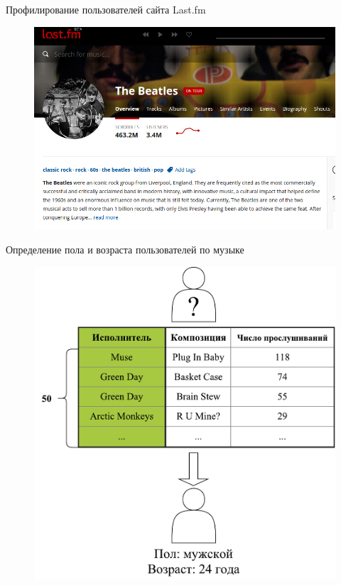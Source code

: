 \documentclass{beamer}
\begin{document}
\begin{frame}{Профилирование пользователей сайта Last.fm}
    \begin{figure}
        \includegraphics[width=\textwidth]{figures/lastfm.png}
    \end{figure}
\end{frame}

\begin{frame}{Определение пола и возраста пользователей по музыке}
    \begin{figure}
        \includegraphics[scale=0.38]{figures/lastfm-problem.pdf}
    \end{figure}
\end{frame}
\end{document}
